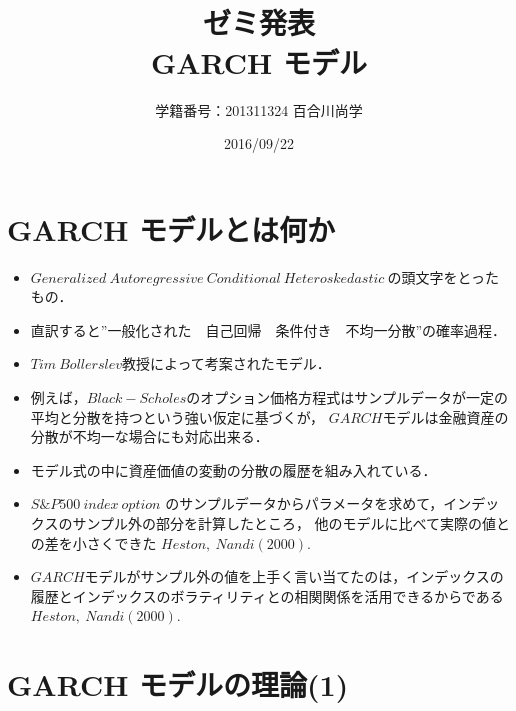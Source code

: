 \documentclass[slide,10pt]{jsarticle}
\def\sheet #1{\section*{\centering \large \bfseries #1}}
\begin{document}
\title{\fontsize{45pt}{2cm}\selectfont \\ゼミ発表\\GARCH モデル\\}
\author{\Huge 学籍番号：201311324 百合川尚学}
\date{\Huge 2016/09/22}
\maketitle

\sheet{\Huge GARCH モデルとは何か}

{\huge
\begin{itemize}
	\vspace{5mm}
	\item $Generalized\ Autoregressive\ Conditional\ Heteroskedastic\ $の頭文字をとったもの．
	\vspace{5mm}
	\item 直訳すると''一般化された　自己回帰　条件付き　不均一分散''の確率過程．
	\vspace{5mm}
	\item $Tim\ Bollerslev$教授によって考案されたモデル．
	\vspace{5mm}
	\item 例えば，$Black-Scholes$のオプション価格方程式はサンプルデータが一定の平均と分散を持つという強い仮定に基づくが，
		$GARCH$モデルは金融資産の分散が不均一な場合にも対応出来る．
	\vspace{5mm}
	\item モデル式の中に資産価値の変動の分散の履歴を組み入れている．
	\vspace{5mm}
	\item $S\&P500\ index\ option$ のサンプルデータからパラメータを求めて，インデックスのサンプル外の部分を計算したところ，
		他のモデルに比べて実際の値との差を小さくできた $Heston,\ Nandi (2000)$.
	\vspace{5mm}
	\item $GARCH$モデルがサンプル外の値を上手く言い当てたのは，インデックスの履歴とインデックスのボラティリティとの相関関係を活用できるからである $Heston,\ Nandi (2000)$.
\end{itemize}
}

\sheet{\Huge GARCH モデルの理論(1)}
\end{document}
